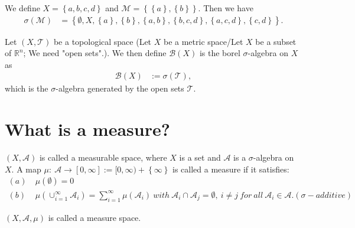 \documentclass[../../note.tex]{subfiles}
\begin{document}
\begin{example}
    We define $X = \left\{a,b,c,d\right\}$ and $\mathcal{M}=\left\{\left\{a\right\}, \left\{b\right\}\right\}$. Then we have 
    \begin{align}
        \sigma(\mathcal{M})
        &= \left\{\emptyset, X, \left\{a\right\}, \left\{b\right\},\left\{a,b\right\}, \left\{b,c,d\right\},\left\{a,c,d\right\}, \left\{c,d\right\}\right\}.
    \end{align}
\end{example}

\begin{definition}
    Let $(X, \mathcal{T})$ be a topological space (Let $X$ be a metric space/Let $X$ be a subset of $\mathbb{R}^n$; We need "open sets".). We then define $\mathcal{B}(X)$ is the borel $\sigma$-algebra on $X$ as
    \begin{align}
        \mathcal{B}(X)
        &:= \sigma(\mathcal{T}),
    \end{align}
    which is the $\sigma$-algebra generated by the open sets $\mathcal{T}$.
\end{definition}

\section{What is a measure?}
\begin{definition}[Measure]
    $(X, \mathcal{A})$ is called a measurable space, where $X$ is a set and $\mathcal{A}$ is a $\sigma$-algebra on $X$. A map $\mu:~\mathcal{A} \rightarrow [0,\infty]:= [0,\infty)+\left\{\infty\right\}$ is called a measure if it satisfies:
    \begin{align}
        (a)~& \mu(\emptyset) = 0 \\
        (b)~& \mu(\cup_{i=1}^{\infty}\mathcal{A}_i) = \sum_{i=1}^{\infty} \mu(\mathcal{A}_i)~with~\mathcal{A}_i \cap \mathcal{A}_j = \emptyset,~i \neq j~for~all~\mathcal{A}_i \in \mathcal{A}. (\sigma-additive) 
    \end{align}
\end{definition}

\begin{definition}
    $(X,\mathcal{A},\mu)$ is called a measure space.
\end{definition}
\end{document}

